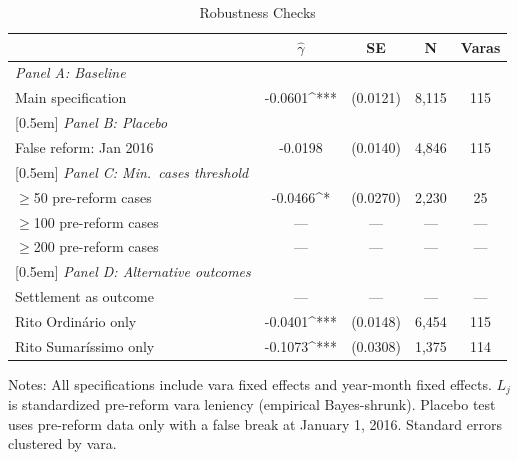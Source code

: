 \begin{table}[t]
\centering
\caption{Robustness Checks}
\label{tab:robustness}
\begin{tabular}{lcccc}
\hline\hline
 & $\hat{\gamma}$ & SE & N & Varas \\
\hline
\textit{Panel A: Baseline} & & & & \\
Main specification & -0.0601^{***} & (0.0121) & 8,115 & 115 \\
{}[0.5em]
\textit{Panel B: Placebo} & & & & \\
False reform: Jan 2016 & -0.0198 & (0.0140) & 4,846 & 115 \\
{}[0.5em]
\textit{Panel C: Min.\ cases threshold} & & & & \\
$\geq$50 pre-reform cases & -0.0466^{*} & (0.0270) & 2,230 & 25 \\
$\geq$100 pre-reform cases & --- & --- & --- & --- \\
$\geq$200 pre-reform cases & --- & --- & --- & --- \\
{}[0.5em]
\textit{Panel D: Alternative outcomes} & & & & \\
Settlement as outcome & --- & --- & --- & --- \\
Rito Ordin\'ario only & -0.0401^{***} & (0.0148) & 6,454 & 115 \\
Rito Sumar\'issimo only & -0.1073^{***} & (0.0308) & 1,375 & 114 \\
\hline\hline
\end{tabular}
\begin{flushleft}\small
Notes: All specifications include vara fixed effects and year-month fixed effects. $L_j$ is standardized pre-reform vara leniency (empirical Bayes-shrunk). Placebo test uses pre-reform data only with a false break at January 1, 2016. Standard errors clustered by vara.
\end{flushleft}
\end{table}
